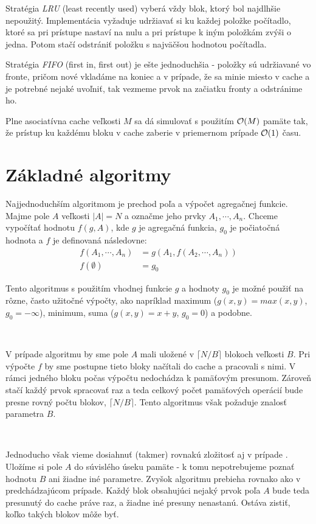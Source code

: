 Stratégia {\em LRU} (least recently used) vyberá vždy blok, ktorý bol najdlhšie nepoužitý. Implementácia vyžaduje udržiavať si ku každej položke počítadlo, ktoré sa pri prístupe nastaví na nulu a pri prístupe k iným položkám zvýši o jedna. Potom stačí odstrániť položku s najväčšou hodnotou počítadla.

Stratégia {\em FIFO} (first in, first out) je ešte jednoduchšia - položky sú udržiavané vo fronte, pričom nové vkladáme na koniec a v prípade, že sa minie miesto v cache a je potrebné nejaké uvoľniť, tak vezmeme prvok na začiatku fronty a odstránime ho.

\begin{lema}
Plne asociatívna cache veľkosti $M$ sa dá simulovať s použitím $\mathcal{O}(M)$ pamäte tak, že prístup ku každému bloku v cache zaberie v priemernom prípade $\mathcal{O}(1)$ času. \citep[Lemma 16]{FrigoLePr99}
\end{lema}

\section{Základné algoritmy}

Najjednoduchším \obliv algoritmom je prechod poľa a výpočet agregačnej funkcie. Majme pole $A$ veľkosti $|A| = N$ a označme jeho prvky $A_1,\cdots,A_n$. Chceme vypočítať hodnotu $f(g, A)$, kde $g$ je agregačná funkcia, $g_0$ je počiatočná hodnota a $f$ je definovaná následovne:
\[
\begin{aligned}
f(A_1,\cdots,A_n) &= g(A_1, f(A_2,\cdots,A_n)) \\
f(\emptyset) &= g_0
\end{aligned}
\]

Tento algoritmus s použitím vhodnej funkcie $g$ a hodnoty $g_0$ je možné použiť na rôzne, často užitočné výpočty, ako napríklad maximum ($g(x, y) = max(x, y)$, $g_0 = -\infty$), minimum, suma ($g(x,y) = x+y$, $g_0 = 0$) a podobne.

\

V prípade \aware algoritmu by sme pole $A$ mali uložené v $\lceil N/B \rceil$ blokoch veľkosti $B$. Pri výpočte $f$ by sme postupne tieto bloky načítali do cache a pracovali s nimi. V rámci jedného bloku počas výpočtu nedochádza k pamäťovým presunom. Zároveň stačí každý prvok spracovať raz a teda celkový počet pamäťových operácií bude presne rovný počtu blokov, $\lceil N/B \rceil$. Tento algoritmus však požaduje znalosť parametra $B$.

\

Jednoducho však vieme dosiahnuť (takmer) rovnakú zložitosť aj v prípade \obliv. Uložíme si pole $A$ do súvislého úseku pamäte - k tomu nepotrebujeme poznať hodnotu $B$ ani žiadne iné parametre. Zvyšok algoritmu prebieha rovnako ako v predchádzajúcom prípade. Každý blok obsahujúci nejaký prvok poľa $A$ bude teda presunutý do cache práve raz, a žiadne iné presuny nenastanú. Ostáva zistiť, koľko takých blokov môže byť.

